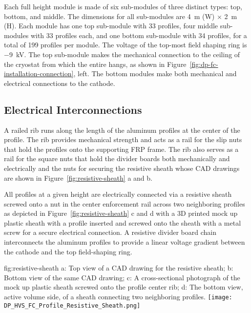 Each full height  module is made of six sub-modules of three distinct types: top, bottom, and middle. The dimensions for all sub-modules are \SI{4}{\m} (W) $\times$ \SI{2}{\m} (H).
Each module has one top sub-module with \num{33} profiles, four middle sub-modules with \num{33} profiles each, and one bottom sub-module with \num{34} profiles, for a total of \num{199} profiles per module. 
The voltage of the top-most field shaping ring is \SI{-9}{\kV}. 
The top sub-module makes the mechanical connection to the ceiling of the cryostat from which the entire  hangs, as shown in Figure~\ref{fig:dp-fc-installation-connection}, left. The bottom modules make both mechanical and electrical connections to the cathode. 

\subsection{Electrical Interconnections}
A railed rib runs along the length of the aluminum profiles at the center of the profile.  The rib provides mechanical strength and acts as a rail for the slip nuts that hold the profiles onto the supporting FRP frame. The rib also serves as a rail for the square nuts that hold the  divider boards both mechanically and electrically and the nuts for securing the resistive sheath whose CAD drawings are shown in Figure~\ref{fig:resistive-sheath} a and b. 

All profiles at a given height are electrically connected via a resistive sheath screwed onto a nut in the center enforcement rail across two neighboring profiles as depicted in Figure~\ref{fig:resistive-sheath} c and d with a 3D printed mock up plastic sheath with a profile inserted and screwed onto the sheath with a metal screw for a secure electrical connection. A resistive divider board chain interconnects the aluminum profiles to provide a linear voltage gradient between the cathode and the top field-shaping ring.   

\begin{dunefigure}{fig:resistive-sheath}
{a: Top view of a CAD drawing for the resistive sheath; b: Bottom view of the same CAD drawing; c: A cross-sectional photograph of the mock up plastic sheath screwed onto the profile center rib; d: The bottom view, active volume side, of a sheath connecting two neighboring profiles.} 
\texttt{[image: DP\_HVS\_FC\_Profile\_Resistive\_Sheath.png]}
\end{dunefigure}


